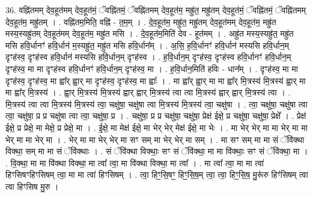 \documentclass[17pt]{extarticle}
\begin{document}
36. वह्नि॑तमम् देव॒हूत॑मम् देव॒हूत॑मं॒ ॅवह्नि॑तमं॒ ॅवह्नि॑तमम् देव॒हूत॑म॒ मह्रु॑त॒ मह्रु॑तम् देव॒हूत॑मं॒ ॅवह्नि॑तमं॒ ॅवह्नि॑तमम् देव॒हूत॑म॒ मह्रु॑तम् । . वह्नि॑तम॒मिति॒ वह्नि॑ - त॒म॒म् । . दे॒व॒हूत॑म॒ मह्रु॑त॒ मह्रु॑तम् देव॒हूत॑मम् देव॒हूत॑म॒ मह्रु॑त मस्य॒स्यह्रु॑तम् देव॒हूत॑मम् देव॒हूत॑म॒ मह्रु॑त मसि । . दे॒व॒हूत॑म॒मिति॑ देव - हूत॑मम् । . अह्रु॑त मस्य॒स्यह्रु॑त॒ मह्रु॑त मसि हवि॒र्धानꣳ॑ हवि॒र्धान॑ म॒स्यह्रु॑त॒ मह्रु॑त मसि हवि॒र्धान᳚म् । . अ॒सि॒ ह॒वि॒र्धानꣳ॑ हवि॒र्धान॑ मस्यसि हवि॒र्धान॒म् दृꣳह॑स्व॒ दृꣳह॑स्व हवि॒र्धान॑ मस्यसि हवि॒र्धान॒म् दृꣳह॑स्व । . ह॒वि॒र्धान॒म् दृꣳह॑स्व॒ दृꣳह॑स्व हवि॒र्धानꣳ॑ हवि॒र्धान॒म् दृꣳह॑स्व॒ मा मा दृꣳह॑स्व हवि॒र्धानꣳ॑ हवि॒र्धान॒म् दृꣳह॑स्व॒ मा । . ह॒वि॒र्धान॒मिति॑ हविः - धान᳚म् । . दृꣳह॑स्व॒ मा मा दृꣳह॑स्व॒ दृꣳह॑स्व॒ मा ह्वा᳚र् ह्वा॒र् मा दृꣳह॑स्व॒ दृꣳह॑स्व॒ मा ह्वाः᳚ । . मा ह्वा᳚र् ह्वा॒र् मा मा ह्वा᳚र् मि॒त्रस्य॑ मि॒त्रस्य॑ ह्वा॒र् मा मा ह्वा᳚र् मि॒त्रस्य॑ । . ह्वा॒र् मि॒त्रस्य॑ मि॒त्रस्य॑ ह्वार् ह्वार् मि॒त्रस्य॑ त्वा त्वा मि॒त्रस्य॑ ह्वार् ह्वार् मि॒त्रस्य॑ त्वा । . मि॒त्रस्य॑ त्वा त्वा मि॒त्रस्य॑ मि॒त्रस्य॑ त्वा॒ चक्षु॑षा॒ चक्षु॑षा त्वा मि॒त्रस्य॑ मि॒त्रस्य॑ त्वा॒ चक्षु॑षा । . त्वा॒ चक्षु॑षा॒ चक्षु॑षा त्वा त्वा॒ चक्षु॑षा॒ प्र प्र चक्षु॑षा त्वा त्वा॒ चक्षु॑षा॒ प्र । . चक्षु॑षा॒ प्र प्र चक्षु॑षा॒ चक्षु॑षा॒ प्रेक्ष॑ ईक्षे॒ प्र चक्षु॑षा॒ चक्षु॑षा॒ प्रेक्षे᳚ । . प्रेक्ष॑ ईक्षे॒ प्र प्रेक्षे॒ मा मेक्षे॒ प्र प्रेक्षे॒ मा । . ई॒क्षे॒ मा मेक्ष॑ ईक्षे॒ मा भेर् भेर् मेक्ष॑ ईक्षे॒ मा भेः । . मा भेर् भेर् मा मा भेर् मा मा भेर् मा मा भेर् मा । . भेर् मा मा भेर् भेर् मा सꣳ सम् मा भेर् भेर् मा सम् । . मा सꣳ सम् मा मा सं ॅवि॑क्था विक्था॒ सम् मा मा सं ॅवि॑क्थाः । . सं ॅवि॑क्था विक्थाः॒ सꣳ सं ॅवि॑क्था॒ मा मा वि॑क्थाः॒ सꣳ सं ॅवि॑क्था॒ मा । . वि॒क्था॒ मा मा वि॑क्था विक्था॒ मा त्वा᳚ त्वा॒ मा वि॑क्था विक्था॒ मा त्वा᳚ । . मा त्वा᳚ त्वा॒ मा मा त्वा॑ हिꣳसिषꣳहिꣳसिषम् त्वा॒ मा मा त्वा॑ हिꣳसिषम् । . त्वा॒ हिꣳ॒॒सि॒षꣳ॒॒ हिꣳ॒॒सि॒ष॒म् त्वा॒ त्वा॒ हिꣳ॒॒सि॒ष॒ मु॒रू॑रु हिꣳ॑सिषम् त्वा त्वा हिꣳसिष मु॒रु । \newline
\pagebreak
{}
\end{document}
